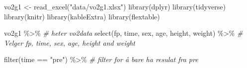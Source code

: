 \documentclass[
]{article}
\newenvironment{Shaded}{\begin{snugshade}}{\end{snugshade}}
\newcommand{\CommentTok}[1]{\textcolor[rgb]{0.56,0.35,0.01}{\textit{#1}}}
\newcommand{\FunctionTok}[1]{\textcolor[rgb]{0.00,0.00,0.00}{#1}}
\newcommand{\NormalTok}[1]{#1}
\newcommand{\OtherTok}[1]{\textcolor[rgb]{0.56,0.35,0.01}{#1}}
\newcommand{\SpecialCharTok}[1]{\textcolor[rgb]{0.00,0.00,0.00}{#1}}
\newcommand{\StringTok}[1]{\textcolor[rgb]{0.31,0.60,0.02}{#1}}
\begin{document}
\begin{Shaded}
\begin{Highlighting}[]
\NormalTok{vo2g1 }\OtherTok{\textless{}{-}} \FunctionTok{read\_excel}\NormalTok{(}\StringTok{"data/vo2g1.xlsx"}\NormalTok{)}
\FunctionTok{library}\NormalTok{(dplyr)}
\FunctionTok{library}\NormalTok{(tidyverse)}
\FunctionTok{library}\NormalTok{(knitr)}
\FunctionTok{library}\NormalTok{(kableExtra)}
\FunctionTok{library}\NormalTok{(flextable)}

\NormalTok{vo2g1 }\SpecialCharTok{\%\textgreater{}\%} \CommentTok{\# heter vo2data}
  \FunctionTok{select}\NormalTok{(fp, time, sex, age, height, weight) }\SpecialCharTok{\%\textgreater{}\%} 
  \CommentTok{\# Velger fp, time, sex, age, height and weight}
  
  \FunctionTok{filter}\NormalTok{(time }\SpecialCharTok{==} \StringTok{"pre"}\NormalTok{) }\SpecialCharTok{\%\textgreater{}\%} \CommentTok{\# filter for å bare ha resulat fra pre}
  

\end{Highlighting}
\end{Shaded}
\end{document}
